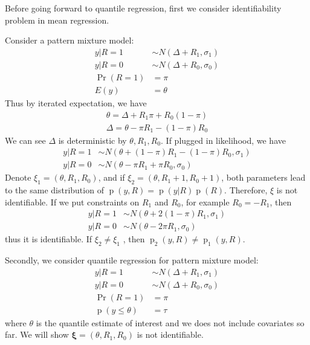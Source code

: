 \documentclass[12pt]{article}
\DeclareMathOperator{\pr}{p}
\DeclareMathOperator{\prob}{Pr}
\begin{document}
Before going forward to quantile regression, first we consider
identifiability problem in mean regression.

Consider a pattern mixture model:
\begin{align*}
  y | R = 1 & \sim N(\Delta + R_1 , \sigma_1) \\
  y | R = 0 & \sim N(\Delta + R_0, \sigma_0) \\
  \prob (R = 1) & = \pi \\
  E (y ) & = \theta
\end{align*}
Thus by iterated expectation, we have
\begin{align*}
  \theta = \Delta + R_1\pi + R_0(1-\pi) \\
  \Delta = \theta - \pi R_1 - (1 - \pi)R_0
\end{align*}
We can see $\Delta$ is deterministic by $\theta, R_1, R_0$. If plugged
in likelihood, we have
\begin{align*}
  y | R = 1 & \sim N(\theta + (1 - \pi)R_1 - (1 - \pi)R_0, \sigma_1) \\
  y | R = 0 & \sim N(\theta - \pi R_1 + \pi R_0, \sigma_0)
\end{align*}
Denote $\xi_1 = (\theta , R_1, R_0)$, and if $\xi_2 = (\theta, R_1+ 1,
R_0+1)$, both parameters lead to the same distribution of $\pr(y, R) =
\pr(y|R)\pr(R)$. Therefore, $\xi$ is not identifiable.  If we put
constraints on $R_1$ and $R_0$, for example $R_0 = -R_1$, then
\begin{align*}
  y | R = 1 & \sim N(\theta + 2(1 - \pi)R_1 , \sigma_1) \\
  y | R = 0 & \sim N(\theta - 2\pi R_1 , \sigma_0)
\end{align*}
thus it is identifiable. If $\xi_2 \neq \xi_1$ , then $\pr_2(y, R)
\neq \pr_1(y, R)$.

Secondly, we consider quantile regression for pattern mixture model:
\begin{align*}
  y | R = 1 & \sim N(\Delta + R_1 , \sigma_1) \\
  y | R = 0 & \sim N(\Delta + R_0, \sigma_0) \\
  \prob (R = 1) & = \pi \\
  \pr (y \leq \theta ) & = \tau
\end{align*}
where $\theta$ is the quantile estimate of interest and we does not
include covariates so far. We will show $\bm \xi = (\theta, R_1, R_0)
$ is not identifiable.
\end{document}
